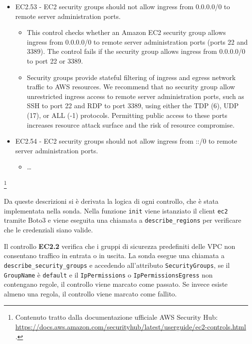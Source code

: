 \begin{mdframed}[backgroundcolor=gray!05, linecolor=gray!50]
\begin{itemize}
\begin{itemize}
    \end{itemize}
    \item EC2.53 - EC2 security groups should not allow ingress from 0.0.0.0/0 to remote server administration ports.
    \begin{itemize}
        \item This control checks whether an Amazon EC2 security group allows ingress from 0.0.0.0/0 to remote server administration ports (ports 22 and 3389). The control fails if the security group allows ingress from 0.0.0.0/0 to port 22 or 3389.
        \item Security groups provide stateful filtering of ingress and egress network traffic to AWS resources. We recommend that no security group allow unrestricted ingress access to remote server administration ports, such as SSH to port 22 and RDP to port 3389, using either the TDP (6), UDP (17), or ALL (-1) protocols. Permitting public access to these ports increases resource attack surface and the risk of resource compromise.
    \end{itemize}
    \item EC2.54 - EC2 security groups should not allow ingress from ::/0 to remote server administration ports.
    \begin{itemize}
        \item \dots
    \end{itemize}
\end{itemize}
\end{mdframed}
\footnote{Contenuto tratto dalla documentazione ufficiale AWS Security Hub: \url{https://docs.aws.amazon.com/securityhub/latest/userguide/ec2-controls.html} .}

Da queste descrizioni si è derivata la logica di ogni controllo, che è stata implementata nella sonda. 
Nella funzione \texttt{init} viene istanziato il client \texttt{ec2} tramite Boto3 e viene eseguita una chiamata a \texttt{describe\_regions} per verificare che le credenziali siano valide. 

Il controllo \textbf{EC2.2} verifica che i gruppi di sicurezza predefiniti delle VPC non consentano traffico in entrata o in uscita. La sonda esegue una chiamata a \texttt{describe\_security\_groups} e accedendo all'attributo \texttt{SecurityGroups}, se il \texttt{GroupName} è \texttt{default} e il \texttt{IpPermissions} o \texttt{IpPermissionsEgress} non contengano regole, il controllo viene marcato come passato. Se invece esiste almeno una regola, il controllo viene marcato come fallito. 

